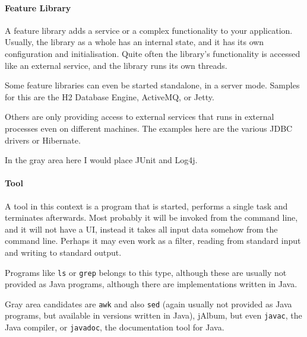 \documentclass[11pt,a4paper, titlepage, parskip=half, headsepline, footsepline, cleardoublepage=current, headheight=1cm]{scrbook}
\begin{document}

\paragraph{Feature Library}\label{sec:FeatureLibrary}
A feature library adds a service or a complex functionality to your application. Usually, the library as a whole has an internal state, and it has its own configuration and initialisation. Quite often the library's functionality is accessed like an external service, and the library runs its own threads.

Some feature libraries can even be started standalone, in a server mode. Samples for this are the H2 Database Engine\autocite{H2_DATABASE}, ActiveMQ\autocite{APACHE_ACTIVEMQ}, or Jetty\autocite{ECLIPSE_JETTY}.

Others are only providing access to external services that runs in external processes even on different machines. The examples here are the various JDBC drivers or Hibernate\autocite{HIBERNATE_ORM}.

In the gray area here I would place JUnit\autocite{JUNIT5} and Log4j\autocite{APACHE_LOG4J}.


\paragraph{Tool}\label{sec:Tool}
A tool in this context is a program that is started, performs a single task and terminates afterwards. Most probably it will be invoked from the command line, and it will not have a UI, instead it takes all input data somehow from the command line. Perhaps it may even work as a filter\autocite{WIKIPEDIA:Filter}, reading from standard input and writing to standard output.

Programs like \verb#ls# or \verb#grep# belongs to this type, although these are usually not provided as Java programs, although there are implementations written in Java.

Gray area candidates are \verb#awk# and also \verb#sed# (again usually not provided as Java programs, but available in versions written in Java), jAlbum\autocite{JALBUM}, but even \verb#javac#, the Java compiler, or \verb#javadoc#, the documentation tool for Java.
\end{document}
